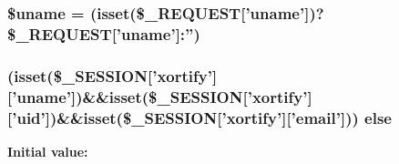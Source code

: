 \hypertarget{stopforumspam_8com_2post_8loader_8php_a227a9443cabbe5e23cfc10c4371e09d1}{
\subsubsection[{\$uname}]{\setlength{\rightskip}{0pt plus 5cm}\$uname = (isset(\$\-\_\-\-R\-E\-Q\-U\-E\-S\-T\mbox{[}'uname'\mbox{]})?\$\-\_\-\-R\-E\-Q\-U\-E\-S\-T\mbox{[}'uname'\mbox{]}\-:'')}}\label{stopforumspam_8com_2post_8loader_8php_a227a9443cabbe5e23cfc10c4371e09d1}
\hypertarget{stopforumspam_8com_2post_8loader_8php_a99f38b0c8c178a9286d03586510aa646}{
\subsubsection[{else}]{ (isset(\$\-\_\-\-S\-E\-S\-S\-I\-O\-N\mbox{[}'xortify'\mbox{]}\mbox{[}'uname'\mbox{]})\&\&isset(\$\-\_\-\-S\-E\-S\-S\-I\-O\-N\mbox{[}'xortify'\mbox{]}\mbox{[}'uid'\mbox{]})\&\&isset(\$\-\_\-\-S\-E\-S\-S\-I\-O\-N\mbox{[}'xortify'\mbox{]}\mbox{[}'email'\mbox{]})) else}}\label{stopforumspam_8com_2post_8loader_8php_a99f38b0c8c178a9286d03586510aa646}
{\bfseries Initial value\-:}
